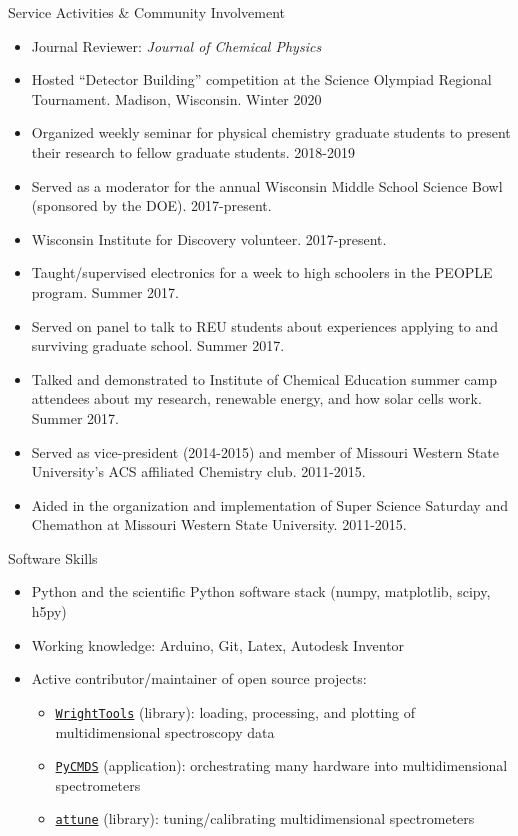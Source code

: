 \documentclass{resume} %
\begin{document}
\begin{rSection}{Service Activities \& Community Involvement}

\begin{itemize}[leftmargin = 0 pt]
	\item Journal Reviewer: \emph{Journal of Chemical Physics}
	\item Hosted ``Detector Building'' competition at the Science Olympiad Regional Tournament. Madison, Wisconsin. Winter 2020
	\item Organized weekly seminar for physical chemistry graduate students to present their research to fellow graduate students. 2018-2019
	\item Served as a moderator for the annual Wisconsin Middle School Science Bowl (sponsored by the DOE). 2017-present.
	\item Wisconsin Institute for Discovery volunteer. 2017-present. 
	\item Taught/supervised electronics for a week to high schoolers in the PEOPLE program. Summer 2017.
	\item Served on panel to talk to REU students about experiences applying to and surviving graduate school. Summer 2017.
	\item Talked and demonstrated to Institute of Chemical Education summer camp attendees about my research, renewable energy, and how solar cells work. Summer 2017.  
	\item Served as vice-president (2014-2015) and member of Missouri Western State University's ACS affiliated Chemistry club. 2011-2015.
	\item Aided in the organization and implementation of Super Science Saturday and Chemathon at Missouri Western State University. 2011-2015.	
\end{itemize}

\end{rSection}

\begin{rSection}{Software Skills}
	\begin{itemize}[leftmargin = 0 pt]
		\item Python and the scientific Python software stack (numpy, matplotlib, scipy, h5py)
		\item Working knowledge: Arduino, Git, Latex, Autodesk Inventor
		\item Active contributor/maintainer of open source projects:
		\begin{itemize}
			\item \href{http://wright.tools}{\texttt{WrightTools}} (library): loading, processing, and plotting of multidimensional spectroscopy data 
			\item \href{http://github.com/wright-group/PyCMDS}{\texttt{PyCMDS}} (application): orchestrating many hardware into multidimensional spectrometers  
			\item \href{http://github.com/wright-group/attune}{\texttt{attune}} (library): tuning/calibrating multidimensional spectrometers
		\end{itemize}
		
	\end{itemize}	
\end{rSection}
\end{document}
